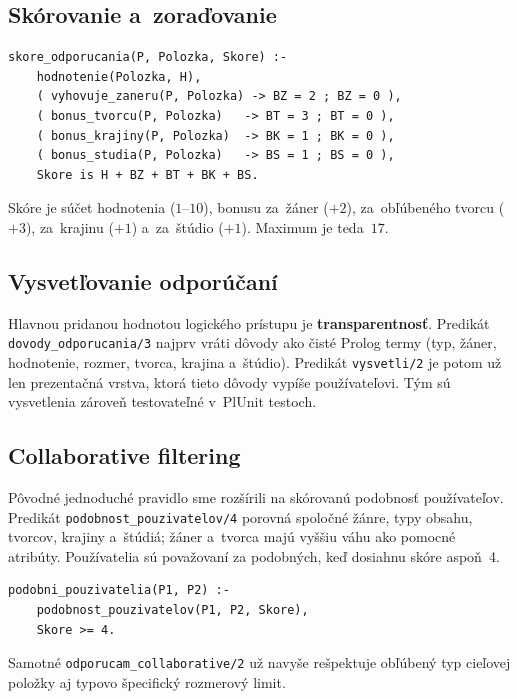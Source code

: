 \documentclass[11pt,a4paper]{article}
\begin{document}
\subsection{Skórovanie a~zoraďovanie}

\begin{lstlisting}
skore_odporucania(P, Polozka, Skore) :-
    hodnotenie(Polozka, H),
    ( vyhovuje_zaneru(P, Polozka) -> BZ = 2 ; BZ = 0 ),
    ( bonus_tvorcu(P, Polozka)   -> BT = 3 ; BT = 0 ),
    ( bonus_krajiny(P, Polozka)  -> BK = 1 ; BK = 0 ),
    ( bonus_studia(P, Polozka)   -> BS = 1 ; BS = 0 ),
    Skore is H + BZ + BT + BK + BS.
\end{lstlisting}

Skóre je súčet hodnotenia ($1$--$10$), bonusu za~žáner ($+2$),
za~obľúbeného tvorcu ($+3$), za~krajinu ($+1$) a~za~štúdio
($+1$). Maximum je teda~$17$.

\subsection{Vysvetľovanie odporúčaní}

Hlavnou pridanou hodnotou logického prístupu je
\textbf{transparentnosť}. Predikát
\texttt{dovody\_odporucania/3} najprv vráti dôvody ako čisté
Prolog termy (typ, žáner, hodnotenie, rozmer, tvorca, krajina
a~štúdio). Predikát \texttt{vysvetli/2} je potom už len
prezentačná vrstva, ktorá tieto dôvody vypíše používateľovi.
Tým sú vysvetlenia zároveň testovateľné v~PlUnit testoch.

\subsection{Collaborative filtering}

Pôvodné jednoduché pravidlo  sme
rozšírili na skórovanú podobnosť používateľov. Predikát
\texttt{podobnost\_pouzivatelov/4} porovná spoločné žánre, typy
obsahu, tvorcov, krajiny a~štúdiá; žáner a~tvorca majú vyššiu váhu
ako pomocné atribúty. Používatelia sú považovaní za podobných, keď
dosiahnu skóre aspoň~4.

\begin{lstlisting}
podobni_pouzivatelia(P1, P2) :-
    podobnost_pouzivatelov(P1, P2, Skore),
    Skore >= 4.
\end{lstlisting}

\noindent
Samotné \texttt{odporucam\_collaborative/2} už navyše rešpektuje
obľúbený typ cieľovej položky aj typovo špecifický rozmerový limit.
\end{document}
